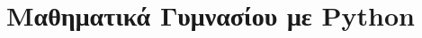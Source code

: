 \documentclass[b5paper,11pt,twoside,openleft]{memoir}
\begin{document}
\title{%
Μαθηματικά Γυμνασίου με Python}

\author{}
\maketitle
%

%
%
%
%
%
%
\end{document}
